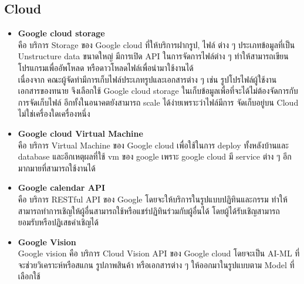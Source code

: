 \documentclass[12pt,oneside,openright,a4paper]{cpe-thai-project}
\begin{document}
\subsection{Cloud}
\begin{itemize}
\item \textbf{Google cloud storage} \\
\hspace*{1cm} คือ บริการ Storage ของ Google cloud ที่ให้บริการฝากรูป, ไฟล์ ต่าง ๆ ประเภทข้อมูลที่เป็น Unstructure data ขนาดใหญ่ มีการเปิด API ในการจัดการไฟล์ต่าง ๆ ทำให้สามารถเขียนโปรแกรมเพื่ออัพโหลด หรือดาวโหลดไฟล์เพื่อนำมาใช้งานได้ \\
\hspace*{1cm} เนื่องจาก คณะผู้จัดทำมีการเก็บไฟล์ประเภทรูปและเอกสารต่าง ๆ เช่น รูปโปรไฟล์ผู้ใช้งาน เอกสารของทนาย จึงเลือกใช้ Google cloud storage ในเก็บข้อมูลเพื่อที่จะได้ไม่ต้องจัดการกับการจัดเก็บไฟล์ อีกทั้งในอนาคตยังสามารถ scale ได้ง่ายเพราะว่าไฟล์มีการ จัดเก็บอยู่บน Cloud ไม่ใช่เครื่องใดเครื่องหนึ่ง \cite{WhatIsGoogleStorage}
\item \textbf{Google cloud Virtual Machine} \\
\hspace*{1cm} คือ บริการ Virtual Machine ของ Google cloud เพื่อใช้ในการ deploy ทั้งหลังบ้านและ database และอีกเหตุผลที่ใช้ vm ของ google เพราะ google cloud มี service ต่าง ๆ อีกมากมายที่สามารถใช้งานได้ \cite{WhatIsVM,WhatIsGoogleCloudPlatform}
\item \textbf{Google calendar API} \\
\hspace*{1cm} คือ บริการ RESTful API ของ Google โดยจะให้บริการในรูปแบบปฏิทินและกรรม ทำให้สามารถทำการเชิญให้ผู้อื่นสามารถใช้หรือแชร์ปฏิทินร่วมกับผู้อื่นได้ โดยผู้ได้รับเชิญสามารถยอมรับหรือปฏิเสธคําเชิญได้ \cite{WhatIsGoogleCalendar}
\item \textbf{Google Vision} \\
\hspace*{1cm} Google vision  คือ บริการ Cloud Vision API ของ Google cloud โดยจะเป็น AI-ML ที่จะช่วยวิเคราะห์หรือสแกน รูปภาพสินค้า หรือเอกสารต่าง ๆ ให้ออกมาในรูปแบบตาม Model ที่เลือกใช้ \cite{WhatIsGoogleVision}
\end{itemize}
\end{document}
